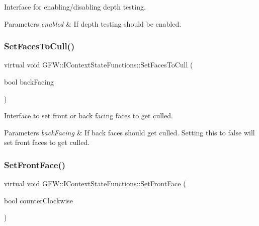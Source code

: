 Interface for enabling/disabling depth testing. 


\begin{DoxyParams}{Parameters}
{\em enabled} & If depth testing should be enabled. \\
\hline
\end{DoxyParams}
\mbox{\label{class_g_f_w_1_1_i_context_state_functions_aeafd5ba03f7ce29872a66fdb1bcaa5f1}} 
\subsubsection{\texorpdfstring{Set\+Faces\+To\+Cull()}{SetFacesToCull()}}
{\footnotesize\ttfamily virtual void G\+F\+W\+::\+I\+Context\+State\+Functions\+::\+Set\+Faces\+To\+Cull (\begin{DoxyParamCaption}\item[{bool}]{back\+Facing }\end{DoxyParamCaption})\hspace{0.3cm}{\ttfamily [pure virtual]}}



Interface to set front or back facing faces to get culled. 


\begin{DoxyParams}{Parameters}
{\em back\+Facing} & If back faces should get culled. Setting this to false will set front faces to get culled. \\
\hline
\end{DoxyParams}
\mbox{\label{class_g_f_w_1_1_i_context_state_functions_a44c131b392dc908ca3bb4f579df5ba57}} 
\subsubsection{\texorpdfstring{Set\+Front\+Face()}{SetFrontFace()}}
{\footnotesize\ttfamily virtual void G\+F\+W\+::\+I\+Context\+State\+Functions\+::\+Set\+Front\+Face (\begin{DoxyParamCaption}\item[{bool}]{counter\+Clockwise }\end{DoxyParamCaption})\hspace{0.3cm}{\ttfamily [pure virtual]}}



